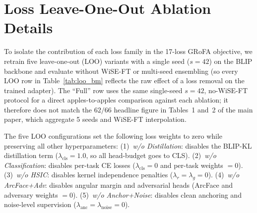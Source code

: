 \section{Loss Leave-One-Out Ablation Details}
\label{app:loo}

To isolate the contribution of each loss family in the 17-loss GRoFA objective, we retrain five leave-one-out (LOO) variants with a single seed ($s{=}42$) on the BLIP backbone and evaluate without WiSE-FT or multi-seed ensembling (so every LOO row in Table~\ref{tab:loo_bm} reflects the raw effect of a loss removal on the trained adapter).
The ``Full'' row uses the same single-seed $s{=}42$, no-WiSE-FT protocol for a direct apples-to-apples comparison against each ablation; it therefore does not match the $62/66$ headline figure in Tables~1 and~2 of the main paper, which aggregate 5 seeds and WiSE-FT interpolation.

The five LOO configurations set the following loss weights to zero while preserving all other hyperparameters:
(1)~\textit{w/o Distillation}: disables the BLIP-KL distillation term ($\lambda_{\text{cls}}{=}1.0$, so all head-budget goes to CLS).
(2)~\textit{w/o Classification}: disables per-task CE losses ($\lambda_{\text{cls}}{=}0$ and per-task weights $=0$).
(3)~\textit{w/o HSIC}: disables kernel independence penalties ($\lambda_r{=}\lambda_g{=}0$).
(4)~\textit{w/o ArcFace+Adv}: disables angular margin and adversarial heads (ArcFace and adversary weights $=0$).
(5)~\textit{w/o Anchor+Noise}: disables clean anchoring and noise-level supervision ($\lambda_{\text{anc}}{=}\lambda_{\text{noise}}{=}0$).

